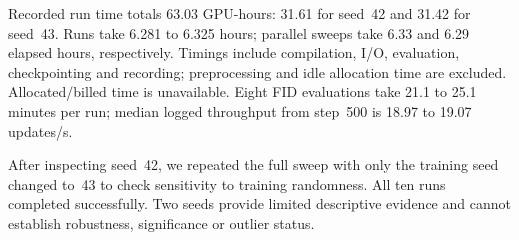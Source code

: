 Recorded run time totals 63.03 GPU-hours: 31.61 for seed~42 and 31.42 for seed~43. Runs take 6.281 to 6.325 hours; parallel sweeps take 6.33 and 6.29 elapsed hours, respectively. Timings include compilation, I/O, evaluation, checkpointing and recording; preprocessing and idle allocation time are excluded. Allocated/billed time is unavailable. Eight FID evaluations take 21.1 to 25.1 minutes per run; median logged throughput from step~500 is 18.97 to 19.07 updates/s.

After inspecting seed~42, we repeated the full sweep with only the training seed changed to~43 to check sensitivity to training randomness. All ten runs completed successfully. Two seeds provide limited descriptive evidence and cannot establish robustness, significance or outlier status.
